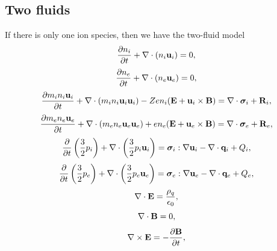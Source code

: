 \documentclass[a4paper,11pt]{report}
\begin{document}
\subsection{Two fluids}
If there is only one ion species, then we have the two-fluid model
\label{sec:mf_2fluid_equations}
\begin{equation}
    \label{eq:mf_2fluid_ni}
    \frac{\partial n_i}{\partial t} + \nabla \cdot \left ( n_i \mathbf{u}_i \right ) = 0,
\end{equation}
\begin{equation}
    \label{eq:mf_2fluid_ne}
    \frac{\partial n_e}{\partial t} + \nabla \cdot \left ( n_e \mathbf{u}_e \right ) = 0,
\end{equation}
\begin{equation}
    \label{eq:mf_2fluid_ui}
    \frac{\partial m_i n_i \mathbf{u}_i}{\partial t} + \nabla \cdot \left ( m_i n_i \mathbf{u}_i \mathbf{u}_i \right) - Z e n_i ( \mathbf{E} + \mathbf{u}_i \times \mathbf{B} ) = \nabla \cdot \bm \sigma_i + \mathbf{R}_i,
\end{equation}
\begin{equation}
    \label{eq:mf_2fluid_ue}
    \frac{\partial m_e n_e \mathbf{u}_e}{\partial t} + \nabla \cdot \left ( m_e n_e \mathbf{u}_e \mathbf{u}_e \right) + e n_e ( \mathbf{E} + \mathbf{u}_e \times \mathbf{B} ) = \nabla \cdot \bm \sigma_e + \mathbf{R}_e,
\end{equation}
\begin{equation}
    \label{eq:mf_2fluid_iei}
    \frac{\partial}{\partial t} \left ( \frac{3}{2} p_i \right ) + \nabla \cdot \left ( \frac{3}{2} p_i \mathbf{u}_i \right ) = \bm \sigma_i : \nabla \mathbf{u}_i - \nabla \cdot \mathbf{q}_i + Q_i,
\end{equation}
\begin{equation}
    \label{eq:mf_2fluid_iee}
    \frac{\partial}{\partial t} \left ( \frac{3}{2} p_e \right ) + \nabla \cdot \left ( \frac{3}{2} p_e \mathbf{u}_e \right ) = \bm \sigma_e : \nabla \mathbf{u}_e - \nabla \cdot \mathbf{q}_e + Q_e,
\end{equation}
\begin{equation}
    \label{eq:mf_2fluid_maxwell_3}
    \nabla \cdot \mathbf{E} = \frac{\rho_q}{\epsilon_0},
\end{equation}
\begin{equation}
    \label{eq:mf_2fluid_maxwell_4}
    \nabla \cdot \mathbf{B} = 0,
\end{equation}
\begin{equation}
    \label{eq:mf_2fluid_maxwell_1}
    \nabla \times \mathbf{E} = -\frac{ \partial \mathbf{B}}{\partial t},
\end{equation}
\end{document}
